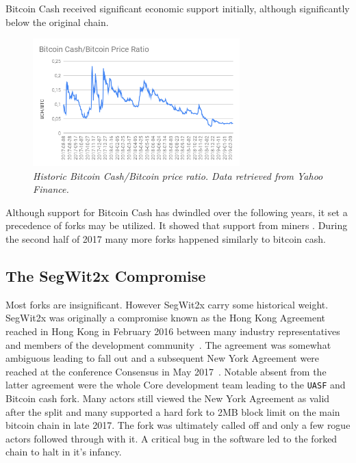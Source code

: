 Bitcoin Cash received significant economic support initially, although significantly below the original chain.

\begin{figure}[!htb]
	\hspace*{-0.7cm} 
	\centering
	\includegraphics[width=8cm]{images/Bitcoin_Cash_Bitcoin_Price_Ratio.png}
	\caption{\textit{Historic Bitcoin Cash/Bitcoin price ratio. Data retrieved from Yahoo Finance.}}
	\label{fig:bch_btc}
	\hspace*{2mm} 	
\end{figure}

Although support for Bitcoin Cash has dwindled over the following years, it set a precedence of forks may be utilized. It showed that support from miners . During the second half of 2017 many more forks happened similarly to bitcoin cash.

\subsection{The SegWit2x Compromise}

Most forks are insignificant. However SegWit2x carry some historical weight. SegWit2x was originally a compromise known as the Hong Kong Agreement reached in Hong Kong in February 2016 between many industry representatives and members of the development community~\cite{hong:kong:agreement}. The agreement was somewhat ambiguous leading to fall out and a subsequent New York Agreement were reached at the conference Consensus in May 2017~\cite{new:york:agreement}. Notable absent from the latter agreement were the whole Core development team leading to the \texttt{UASF} and Bitcoin cash fork. Many actors still viewed the New York Agreement as valid after the split and many supported a hard fork to 2MB block limit on the main bitcoin chain in late 2017. The fork was ultimately called off and only a few rogue actors followed through with it. A critical bug in the software led to the forked chain to halt in it's infancy. 

